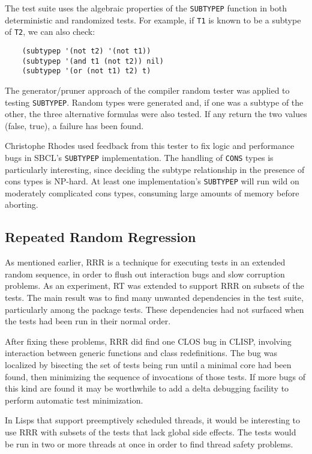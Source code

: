 \documentclass[11pt]{article}
\begin{document}
The test suite uses the algebraic properties of the {\tt SUBTYPEP}
function in both deterministic and randomized tests.  For example,
if {\tt T1} is known to be a subtype of {\tt T2}, we can also check:
\begin{verbatim}
    (subtypep '(not t2) '(not t1))
    (subtypep '(and t1 (not t2)) nil)
    (subtypep '(or (not t1) t2) t)
\end{verbatim}

The generator/pruner approach of the compiler random tester was
applied to testing {\tt SUBTYPEP}.  Random types were generated and,
if one was a subtype of the other, the three alternative formulas
were also tested.  If any return the two values (false, true), a
failure has been found.

Christophe Rhodes used feedback from this tester to fix logic and
performance bugs in SBCL's {\tt SUBTYPEP} implementation.  The
handling of {\tt CONS} types is particularly interesting, since
deciding the subtype relationship in the presence of cons types is
NP-hard.  At least one implementation's {\tt SUBTYPEP} will run wild
on moderately complicated cons types, consuming large amounts of
memory before aborting.

\subsection {Repeated Random Regression}

As mentioned earlier, RRR is a technique for executing tests in an
extended random sequence, in order to flush out interaction bugs and
slow corruption problems.  As an experiment, RT was extended to
support RRR on subsets of the tests.  The main result was to find many
unwanted dependencies in the test suite, particularly among the
package tests.  These dependencies had not surfaced when the tests had
been run in their normal order.

After fixing these problems, RRR did find one CLOS bug in CLISP,
involving interaction between generic functions and class
redefinitions.  The bug was localized by bisecting the set of tests
being run until a minimal core had been found, then minimizing the
sequence of invocations of those tests.  If more bugs of this kind are
found it may be worthwhile to add a delta debugging
\cite{HildZeller:02a} facility to perform automatic test minimization.

In Lisps that support preemptively scheduled threads, it would be
interesting to use RRR with subsets of the tests that lack global side
effects.  The tests would be run in two or more threads at once in
order to find thread safety problems.
\end{document}
